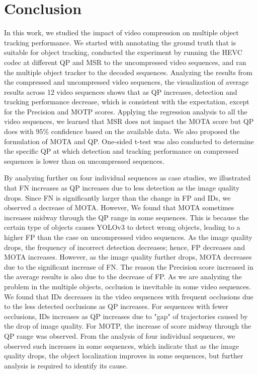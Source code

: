 \chapter{Conclusion}
\label{chap:conclusion}

In this work, we studied the impact of video compression on multiple object tracking performance. We started with annotating the ground truth that is suitable for object tracking, conducted the experiment by running the HEVC codec at different QP and MSR to the uncompressed video sequences, and ran the multiple object tracker to the decoded sequences. Analyzing the results from the compressed and uncompressed video sequences, the visualization of average results across 12 video sequences shows that as QP increases, detection and tracking performance decrease, which is consistent with the expectation, except for the Precision and MOTP scores. Applying the regression analysis to all the video sequences, we learned that MSR does not impact the MOTA score but QP does with 95\% confidence based on the available data. We also proposed the formulation of MOTA and QP. One-sided t-test was also conducted to determine the specific QP at which detection and tracking performance on compressed sequences is lower than on uncompressed sequences. 

By analyzing further on four individual sequences as case studies, we illustrated that FN increases as QP increases due to less detection as the image quality drops. Since FN is significantly larger than the change in FP and IDs, we observed a decrease of MOTA. However, We found that MOTA sometimes increases midway through the QP range in some sequences. This is because the certain type of objects causes YOLOv3 to detect wrong objects, leading to a higher FP than the case on uncompressed video sequences. As the image quality drops, the frequency of incorrect detection decreases; hence, FP decreases and MOTA increases. However, as the image quality further drops, MOTA decreases due to the significant increase of FN. The reason the Precision score increased in the average results is also due to the decrease of FP. As we are analyzing the problem in the multiple objects, occlusion is inevitable in some video sequences. We found that IDs decreases in the video sequences with frequent occlusions due to the less detected occlusions as QP increases. For sequences with fewer occlusions, IDs increases as QP increases due to "gap" of trajectories caused by the drop of image quality. For MOTP, the increase of score midway through the QP range was observed. From the analysis of four individual sequences, we observed such increases in some sequences, which indicate that as the image quality drops, the object localization improves in some sequences, but further analysis is required to identify its cause. 

